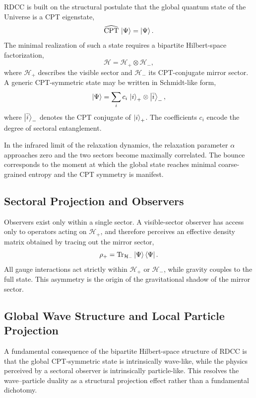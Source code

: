 \documentclass[11pt,a4paper]{article}
\begin{document}
RDCC is built on the structural postulate that the global quantum state of the Universe is a CPT eigenstate,
\begin{equation}
\widehat{\mathrm{CPT}} \, \ket{\Psi} = \ket{\Psi}.
\end{equation}
The minimal realization of such a state requires a bipartite Hilbert-space factorization,
\begin{equation}
\mathcal{H} = \mathcal{H}_+ \otimes \mathcal{H}_-,
\end{equation}
where $\mathcal{H}_+$ describes the visible sector and $\mathcal{H}_-$ its CPT-conjugate mirror sector. A generic CPT-symmetric state may be written in Schmidt-like form,
\begin{equation}
\ket{\Psi} = \sum_i c_i \, \ket{i}_+ \otimes \ket{\bar{i}}_-,
\end{equation}
where $\ket{\bar{i}}_-$ denotes the CPT conjugate of $\ket{i}_+$. The coefficients $c_i$ encode the degree of sectoral entanglement.

In the infrared limit of the relaxation dynamics, the relaxation parameter $\alpha$ approaches zero and the two sectors become maximally correlated. The bounce corresponds to the moment at which the global state reaches minimal coarse-grained entropy and the CPT symmetry is manifest.

\subsection{Sectoral Projection and Observers}

Observers exist only within a single sector. A visible-sector observer has access only to operators acting on $\mathcal{H}_+$, and therefore perceives an effective density matrix obtained by tracing out the mirror sector,
\begin{equation}
\rho_+ = \mathrm{Tr}_{\mathcal{H}_-} \ket{\Psi}\bra{\Psi}.
\end{equation}
All gauge interactions act strictly within $\mathcal{H}_+$ or $\mathcal{H}_-$, while gravity couples to the full state. This asymmetry is the origin of the gravitational shadow of the mirror sector.

\subsection{Global Wave Structure and Local Particle Projection}

A fundamental consequence of the bipartite Hilbert-space structure of RDCC is that the global
CPT-symmetric state is intrinsically wave-like, while the physics perceived by a sectoral observer
is intrinsically particle-like. This resolves the wave–particle duality as a structural projection
effect rather than a fundamental dichotomy.
\end{document}

